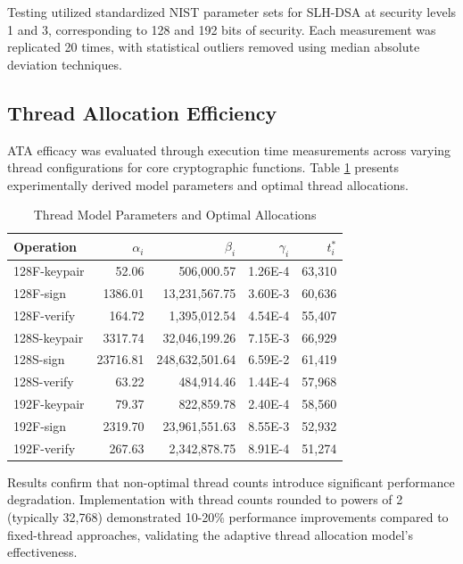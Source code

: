 \documentclass[journal]{IEEEtran}
\begin{document}
Testing utilized standardized NIST parameter sets for SLH-DSA at security levels 1 and 3, corresponding to 128 and 192 bits of security. Each measurement was replicated 20 times, with statistical outliers removed using median absolute deviation techniques.

\subsection{Thread Allocation Efficiency}

ATA efficacy was evaluated through execution time measurements across varying thread configurations for core cryptographic functions. Table \ref{tab:thread_model_params} presents experimentally derived model parameters and optimal thread allocations.

\begin{table}[h]
  \centering
  \caption{Thread Model Parameters and Optimal Allocations}
  \label{tab:thread_model_params}
  \begin{tabular}{@{}lrrrr@{}}
    \toprule
    \textbf{Operation} & \boldmath$\alpha_i$ & \boldmath$\beta_i$ & \boldmath$\gamma_i$ & \boldmath$t_i^*$ \\
    \midrule
    128F-keypair & 52.06 & 506,000.57 & 1.26E-4 & 63,310 \\
    128F-sign & 1386.01 & 13,231,567.75 & 3.60E-3 & 60,636 \\
    128F-verify & 164.72 & 1,395,012.54 & 4.54E-4 & 55,407 \\
    128S-keypair & 3317.74 & 32,046,199.26 & 7.15E-3 & 66,929 \\
    128S-sign & 23716.81 & 248,632,501.64 & 6.59E-2 & 61,419 \\
    128S-verify & 63.22 & 484,914.46 & 1.44E-4 & 57,968 \\
    192F-keypair & 79.37 & 822,859.78 & 2.40E-4 & 58,560 \\
    192F-sign & 2319.70 & 23,961,551.63 & 8.55E-3 & 52,932 \\
    192F-verify & 267.63 & 2,342,878.75 & 8.91E-4 & 51,274 \\
    \bottomrule
  \end{tabular}
\end{table}

Results confirm that non-optimal thread counts introduce significant performance degradation. Implementation with thread counts rounded to powers of 2 (typically 32,768) demonstrated 10-20\% performance improvements compared to fixed-thread approaches, validating the adaptive thread allocation model's effectiveness.
\end{document}
